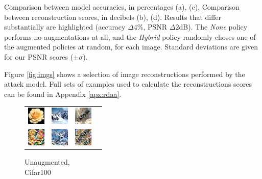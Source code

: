 \begin{table}[h]
\caption{Comparison between model accuracies, in percentages (a), (c). Comparison between reconstruction scores, in decibels (b), (d). Results that differ substantially are highlighted (accuracy $\Delta 4\%$, PSNR $\Delta 2$dB). The \textit{None} policy performs no augmentations at all, and the \textit{Hybrid} policy randomly choses one of the augmented policies at random, for each image. Standard deviations are given for our PSNR scores ($\pm \sigma$).
}
\label{tab:resls}
\end{table}

Figure \ref{fig:imgs} shows a selection of image reconstructions performed by the attack model. Full sets of examples used to calculate the reconstructions scores can be found in Appendix \ref{apx:rdaa}.

\begingroup
\setlength{\tabcolsep}{2pt}
\begin{figure}[h]
\captionsetup{justification=centering}
\begin{subtable}{.25\linewidth}\centering
{\begin{tabular}{ l l l l }
  \includegraphics[width = 24pt]{repimages/ori_21_unaugmented.jpg} &  \includegraphics[width = 24pt]{repimages/ori_22_unaugmented.jpg}  & \includegraphics[width = 24pt]{repimages/ori_98_unaugmented.jpg} \\
  \includegraphics[width = 24pt]{repimages/rec_21_unaugmented.jpg} &  \includegraphics[width = 24pt]{repimages/rec_22_unaugmented.jpg}  &  \includegraphics[width = 24pt]{repimages/rec_98_unaugmented.jpg}  &   \\
\end{tabular}}
\caption{Unaugmented, \\ Cifar100}%

\end{subtable}
\end{figure}
